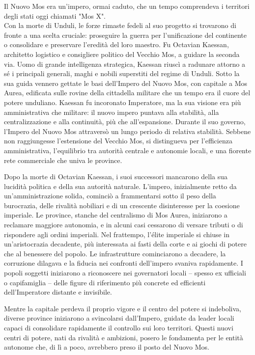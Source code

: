 \documentclass[10pt, a4paper]{report}
\begin{document}
\vfill
	\begin{tcolorbox}[colback=DNDGold!15!DNDWhite, colframe=DarkGoldenrod!85!black, title=\fontsize{13}{15}\bfseries\textsc{Storia dell'Impero del Nuovo Mos}]
		Il Nuovo Mos era un'impero, ormai caduto, che un tempo comprendeva i territori degli stati oggi chiamati "Mos X". \\
		
		Con la morte di Unduli, le forze rimaste fedeli al suo progetto si trovarono di fronte a una scelta cruciale: proseguire la guerra per l’unificazione del continente o consolidare e preservare l’eredità del loro maestro. Fu Octavian Kaessan, architetto logistico e consigliere politico del Vecchio Mos, a guidare la seconda via.
		Uomo di grande intelligenza strategica, Kaessan riuscì a radunare attorno a sé i principali generali, maghi e nobili superstiti del regime di Unduli. Sotto la sua guida vennero gettate le basi dell’Impero del Nuovo Mos, con capitale a Mos Aurea, edificata sulle rovine della cittadella militare che un tempo era il cuore del potere unduliano.
		Kaessan fu incoronato Imperatore, ma la sua visione era più amministrativa che militare: il nuovo impero puntava alla stabilità, alla centralizzazione e alla continuità, più che all’espansione.
		Durante il suo governo, l’Impero del Nuovo Mos attraversò un lungo periodo di relativa stabilità. Sebbene non raggiungesse l’estensione del Vecchio Mos, si distingueva per l’efficienza amministrativa, l’equilibrio tra autorità centrale e autonomie locali, e una fiorente rete commerciale che univa le province.
		
		Dopo la morte di Octavian Kaessan, i suoi successori mancarono della sua lucidità politica e della sua autorità naturale. L’impero, inizialmente retto da un’amministrazione solida, cominciò a frammentarsi sotto il peso della burocrazia, delle rivalità nobiliari e di un crescente disinteresse per la coesione imperiale. Le province, stanche del centralismo di Mos Aurea, iniziarono a reclamare maggiore autonomia, e in alcuni casi cessarono di versare tributi o di rispondere agli ordini imperiali.
		Nel frattempo, l’élite imperiale si chiuse in un’aristocrazia decadente, più interessata ai fasti della corte e ai giochi di potere che al benessere del popolo. Le infrastrutture cominciarono a decadere, la corruzione dilagava e la fiducia nei confronti dell’impero svaniva rapidamente. I popoli soggetti iniziarono a riconoscere nei governatori locali – spesso ex ufficiali o capifamiglia – delle figure di riferimento più concrete ed efficienti dell’Imperatore distante e invisibile. 
		
		Mentre la capitale perdeva il proprio vigore e il centro del potere si indeboliva, diverse province iniziarono a svincolarsi dall’Impero, guidate da leader locali capaci di consolidare rapidamente il controllo sui loro territori. Questi nuovi centri di potere, nati da rivalità e ambizioni, posero le fondamenta per le entità autonome che, di lì a poco, avrebbero preso il posto del Nuovo Mos.
		\label{nuovomos}
	\end{tcolorbox}
\end{document}
